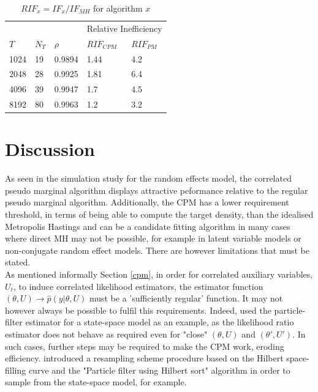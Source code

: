 \documentclass{article}
\begin{document}
\begin{table}[H]
\centering
\begin{tabular}{|l|ll|ll|}
\hline
     & \multicolumn{2}{l|}{} & \multicolumn{2}{l|}{Relative Inefficiency} \\
$T$  & $N_T$     & $\rho$    & $RIF_{CPM}$               & $RIF_{PM}$              \\ \hline
1024 & 19        & 0.9894    & 1.44                      & 4.2                     \\
2048 & 28        & 0.9925    & 1.81                      & 6.4                     \\
4096 & 39        & 0.9947    & 1.7                       & 4.5                     \\
8192 & 80        & 0.9963    & 1.2                       & 3.2                     \\ \hline
\end{tabular}
\caption{$RIF_x = IF_x/ IF_{MH}$ for algorithm $x$}
\end{table}

  \section{Discussion}

As seen in the simulation study for the random effects model, the correlated pseudo marginal algorithm displays attractive peformance relative to the regular pseudo marginal algorithm. Additionally, the CPM has a lower requirement threshold, in terms of being able to compute the target density, than the idealised Metropolis Hastings and can be a candidate fitting algorithm in many cases where direct MH may not be possible, for example in latent variable models or non-conjugate random effect models. There are however limitations that must be stated.\\

  As mentioned informally Section \ref{cpm}, in order for correlated auxiliary variables, $U_t$, to induce correlated likelihood estimators, the estimator function $(\theta, U) \rightarrow \hat{p}(y | \theta, U)$ must be a 'sufficiently regular' function. It may not however always be possible to fulfil this requirements. Indeed, \cite{cpmmDeligiannidis2015} used the particle-filter estimator for a state-space model as an example, as the likelihood ratio estimator does not behave as required even for "close" $(\theta, U)$ and $(\theta\prime, U\prime)$. In such cases, further steps may be required to make the CPM work, eroding efficiency. \cite{cpmmDeligiannidis2015} introduced a resampling scheme procedure based on the Hilbert space-filling curve and the "Particle filter using Hilbert sort" algorithm in order to sample from the state-space model, for example. \\
\end{document}
